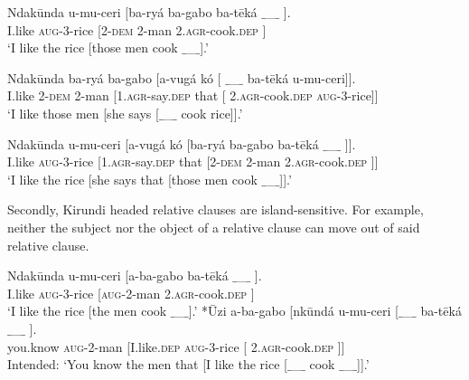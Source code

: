 \documentclass[output=paper,colorlinks,citecolor=brown
]{langscibook}
\begin{document}
\ea
\begin{xlist}

\ex  \label{ex:myers:oext} \gll Ndakūnda u-mu-ceri $[$ba-ryá ba-gabo ba-tēká {$\_$\_$\_$} ].\\
I.like \textsc{aug}-3-rice [2-\textsc{dem} 2-man 2.\textsc{agr}-cook\textsc{.dep} {} ]\\
\glt `I like the rice [those men cook {$\_$\_$\_$}].'  %

\ex \gll Ndakūnda ba-ryá ba-gabo [a-vugá kó [ {$\_$\_$\_$} ba-tēká u-mu-ceri]].\\
I.like 2-\textsc{dem} 2-man [1.\textsc{agr}-say.\textsc{dep} that [ {} 2.\textsc{agr}-cook\textsc{.dep} \textsc{aug}-3-rice]]\\
\glt `I like those men [she says [{$\_$\_$\_$} cook rice]].' \label{ex:myers:subjld} %

\ex \gll Ndakūnda u-mu-ceri [a-vugá kó [ba-ryá ba-gabo ba-tēká {$\_$\_$\_$} ]].\\
I.like \textsc{aug}-3-rice [1.\textsc{agr}-say.\textsc{dep} that [2-\textsc{dem} 2-man 2.\textsc{agr}-cook\textsc{.dep} {} ]]\\
\glt `I like the rice [she says that [those men cook {$\_$\_$\_$}]].' \label{ex:myers:objld}  %
\end{xlist}
\z


Secondly, Kirundi headed relative clauses are island-sensitive. For example, neither the subject  nor the object  of a relative clause can move out of said relative clause.

\ea \label{ex:myers:subjis}
\begin{xlist}

\ex \gll {}Ndakūnda u-mu-ceri [a-ba-gabo ba-tēká {$\_$\_$\_$} ].\\
I.like \textsc{aug}-3-rice [\textsc{aug}-2-man 2.\textsc{agr}-cook\textsc{.dep} {} ]\\
\glt {}`I like the rice [the men cook {$\_$\_$\_$}].'
\ex \gll {}*Ūzi a-ba-gabo [nkūndá u-mu-ceri [{$\_$\_$\_$}  ba-tēká {$\_$\_$\_$} ].\\
you.know \textsc{aug}-2-man [I.like.\textsc{dep} \textsc{aug}-3-rice [{}  2.\textsc{agr}-cook\textsc{.dep} {} ]]\\
\glt {}Intended: `You know the men that [I like the rice [{$\_$\_$\_$} cook {$\_$\_$\_$}]].'
\end{xlist}
\z
\end{document}
